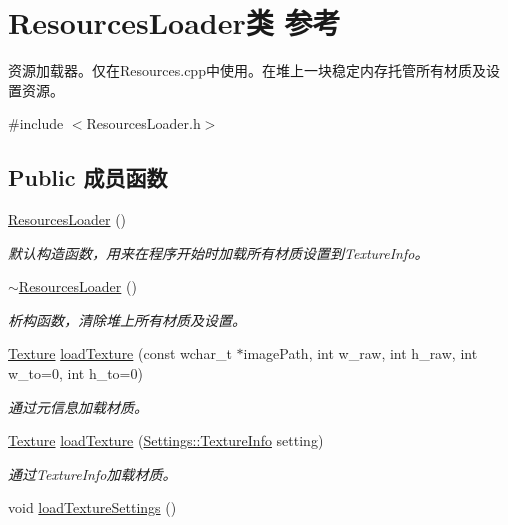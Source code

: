 \hypertarget{class_resources_loader}{}\section{Resources\+Loader类 参考}
\label{class_resources_loader}


资源加载器。仅在Resources.\+cpp中使用。在堆上一块稳定内存托管所有材质及设置资源。  




{\ttfamily \#include $<$Resources\+Loader.\+h$>$}

\subsection*{Public 成员函数}
\begin{DoxyCompactItemize}
\item 
\hyperlink{class_resources_loader_a571b6232d8f1dc1cf94ec752c984a834}{Resources\+Loader} ()
\begin{DoxyCompactList}\small\item\em 默认构造函数，用来在程序开始时加载所有材质设置到Texture\+Info。 \end{DoxyCompactList}\item 
\hyperlink{class_resources_loader_ab4f7fa273471e91107896131bce915da}{$\sim$\+Resources\+Loader} ()
\begin{DoxyCompactList}\small\item\em 析构函数，清除堆上所有材质及设置。 \end{DoxyCompactList}\item 
\hyperlink{struct_texture}{Texture} \hyperlink{class_resources_loader_a38cbe5a4029c4a6fe999a8405703fc30}{load\+Texture} (const wchar\+\_\+t $\ast$image\+Path, int w\+\_\+raw, int h\+\_\+raw, int w\+\_\+to=0, int h\+\_\+to=0)
\begin{DoxyCompactList}\small\item\em 通过元信息加载材质。 \end{DoxyCompactList}\item 
\hyperlink{struct_texture}{Texture} \hyperlink{class_resources_loader_a29b4b9fedb76dc01abcfacc2b31cf25c}{load\+Texture} (\hyperlink{struct_settings_1_1_texture_info}{Settings\+::\+Texture\+Info} setting)
\begin{DoxyCompactList}\small\item\em 通过Texture\+Info加载材质。 \end{DoxyCompactList}\item 
void \hyperlink{class_resources_loader_a80e1d1bb8339e48b0becf401f205436e}{load\+Texture\+Settings} ()

\end{DoxyCompactItemize}

